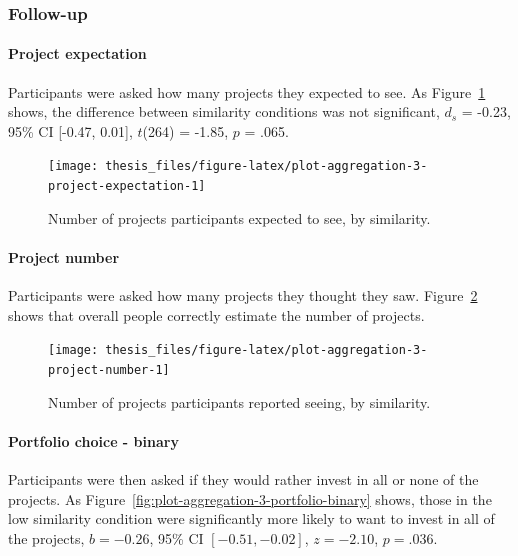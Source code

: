 \documentclass[a4paper, nobind, dvipsnames]{templates/ociamthesis}
\theoremstyle{definition}
\theoremstyle{definition}
\theoremstyle{definition}
\theoremstyle{definition}
\theoremstyle{remark}
\begin{document}
\subsubsection{Follow-up}

\paragraph{Project expectation}

Participants were asked how many projects they expected to see. As
Figure~\ref{fig:plot-aggregation-3-project-expectation} shows, the difference
between similarity conditions was not significant,
\(d_s\) = -0.23, 95\% CI {[}-0.47, 0.01{]}, \(t\)(264) = -1.85, \(p\) = .065.



\begin{figure}
\texttt{[image: thesis\_files/figure-latex/plot-aggregation-3-project-expectation-1]} \caption{Number of projects participants expected to see, by similarity.}\label{fig:plot-aggregation-3-project-expectation}
\end{figure}

\paragraph{Project number}

Participants were asked how many projects they thought they saw.
Figure~\ref{fig:plot-aggregation-3-project-number} shows that overall people
correctly estimate the number of projects.



\begin{figure}
\texttt{[image: thesis\_files/figure-latex/plot-aggregation-3-project-number-1]} \caption{Number of projects participants reported seeing, by similarity.}\label{fig:plot-aggregation-3-project-number}
\end{figure}

\paragraph{Portfolio choice - binary}

Participants were then asked if they would rather invest in all or none of the
projects. As Figure~\ref{fig:plot-aggregation-3-portfolio-binary} shows, those
in the low similarity condition were significantly more likely to want to invest
in all of the projects,
\(b = -0.26\), 95\% CI \([-0.51, -0.02]\), \(z = -2.10\), \(p = .036\).
\end{document}
